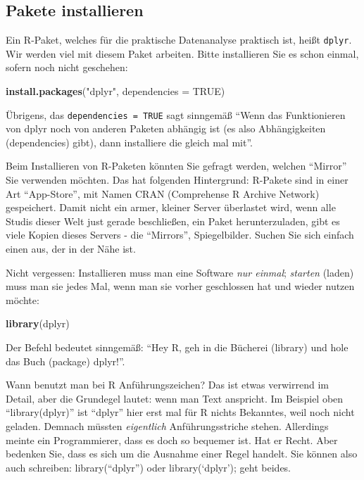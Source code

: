 \documentclass[12pt,]{book}
\makeatletter
\newenvironment{Shaded}{\begin{snugshade}}{\end{snugshade}}
\newcommand{\KeywordTok}[1]{\textcolor[rgb]{0.13,0.29,0.53}{\textbf{{#1}}}}
\newcommand{\DataTypeTok}[1]{\textcolor[rgb]{0.13,0.29,0.53}{{#1}}}
\newcommand{\StringTok}[1]{\textcolor[rgb]{0.31,0.60,0.02}{{#1}}}
\newcommand{\OtherTok}[1]{\textcolor[rgb]{0.56,0.35,0.01}{{#1}}}
\newcommand{\NormalTok}[1]{{#1}}
\newenvironment{kframe}{%
\medskip{}
\setlength{\fboxsep}{.8em}
 \def\at@end@of@kframe{}%
 \ifinner\ifhmode%
  \def\at@end@of@kframe{\end{minipage}}%
  \begin{minipage}{\columnwidth}%
 \fi\fi%
 \def\FrameCommand##1{\hskip\@totalleftmargin \hskip-\fboxsep
 \colorbox{shadecolor}{##1}\hskip-\fboxsep
     \hskip-\linewidth \hskip-\@totalleftmargin \hskip\columnwidth}%
 \MakeFramed {\advance\hsize-\width
   \@totalleftmargin\z@ \linewidth\hsize
   \@setminipage}}%
 {\par\unskip\endMakeFramed%
 \at@end@of@kframe}
\renewenvironment{Shaded}{\begin{kframe}}{\end{kframe}}
\let\BeginKnitrBlock\begin \let\EndKnitrBlock\end
\makeatother
\begin{document}
\subsection{Pakete installieren}\label{pakete-installieren}

Ein R-Paket, welches für die praktische Datenanalyse praktisch ist,
heißt \texttt{dplyr}. Wir werden viel mit diesem Paket arbeiten. Bitte
installieren Sie es schon einmal, sofern noch nicht geschehen:

\begin{Shaded}
\begin{Highlighting}[]
\KeywordTok{install.packages}\NormalTok{(}\StringTok{"dplyr"}\NormalTok{, }\DataTypeTok{dependencies =} \OtherTok{TRUE}\NormalTok{) }
\end{Highlighting}
\end{Shaded}

Übrigens, das \texttt{dependencies\ =\ TRUE} sagt sinngemäß ``Wenn das
Funktionieren von dplyr noch von anderen Paketen abhängig ist (es also
Abhängigkeiten (dependencies) gibt), dann installiere die gleich mal
mit''.

\BeginKnitrBlock{rmdcaution}
Beim Installieren von R-Paketen könnten Sie gefragt werden, welchen
``Mirror'' Sie verwenden möchten. Das hat folgenden Hintergrund:
R-Pakete sind in einer Art ``App-Store'', mit Namen CRAN (Comprehense R
Archive Network) gespeichert. Damit nicht ein armer, kleiner Server
überlastet wird, wenn alle Studis dieser Welt just gerade beschließen,
ein Paket herunterzuladen, gibt es viele Kopien dieses Servers - die
``Mirrors'', Spiegelbilder. Suchen Sie sich einfach einen aus, der in
der Nähe ist.
\EndKnitrBlock{rmdcaution}

Nicht vergessen: Installieren muss man eine Software \emph{nur einmal};
\emph{starten} (laden) muss man sie jedes Mal, wenn man sie vorher
geschlossen hat und wieder nutzen möchte:

\begin{Shaded}
\begin{Highlighting}[]
\KeywordTok{library}\NormalTok{(dplyr) }
\end{Highlighting}
\end{Shaded}

Der Befehl bedeutet sinngemäß: ``Hey R, geh in die Bücherei (library)
und hole das Buch (package) dplyr!''.

\BeginKnitrBlock{rmdcaution}
Wann benutzt man bei R Anführungszeichen? Das ist etwas verwirrend im
Detail, aber die Grundegel lautet: wenn man Text anspricht. Im Beispiel
oben ``library(dplyr)'' ist ``dplyr'' hier erst mal für R nichts
Bekanntes, weil noch nicht geladen. Demnach müssten \emph{eigentlich}
Anführungsstriche stehen. Allerdings meinte ein Programmierer, dass es
doch so bequemer ist. Hat er Recht. Aber bedenken Sie, dass es sich um
die Ausnahme einer Regel handelt. Sie können also auch schreiben:
library(``dplyr'') oder library(`dplyr'); geht beides.
\EndKnitrBlock{rmdcaution}
\end{document}
